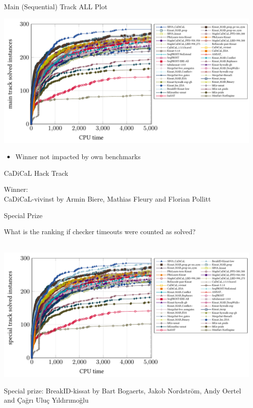 \documentclass{beamer}
\begin{document}
\begin{frame}{Main (Sequential) Track ALL Plot}

\parindent -17pt
\includegraphics[width=1.1\linewidth]{plots/main-all-2023.pdf}

\begin{itemize}
\item Winner not impacted by own benchmarks
\end{itemize}

\end{frame}




\begin{frame}{CaDiCaL Hack Track}

Winner: \\
CaDiCaL-vivinst by Armin Biere, Mathias Fleury and Florian Pollitt


\end{frame}

\begin{frame}{Special Prize}

What is the ranking if checker timeouts were counted as solved?

\bigskip

~~~~\includegraphics[width=\linewidth]{plots/special-all-2023.pdf}

Special prize: BreakID-kissat by Bart Bogaerts, Jakob Nordström, Andy Oertel and Çağrı Uluç Yıldırımoğlu

\end{frame}
\end{document}

